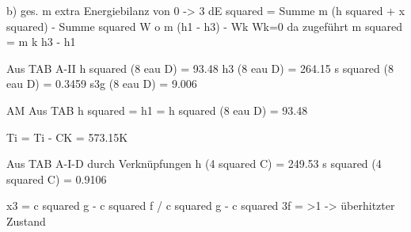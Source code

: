 b) ges. m extra  
Energiebilanz von 0 -> 3  
dE squared = Summe m (h squared + x squared) - Summe squared W  
o m (h1 - h3) - Wk Wk=0 da zugeführt  
m squared = m k h3 - h1  

Aus TAB A-II h squared (8 eau D) = 93.48  
h3 (8 eau D) = 264.15  
s squared (8 eau D) = 0.3459  
s3g (8 eau D) = 9.006  

AM  
Aus TAB h squared = h1 = h squared (8 eau D) = 93.48  

Ti = Ti - CK = 573.15K  

Aus TAB A-I-D durch Verknüpfungen h (4 squared C) = 249.53  
s squared (4 squared C) = 0.9106  

x3 = c squared g - c squared f / c squared g - c squared 3f = >1 -> überhitzter Zustand